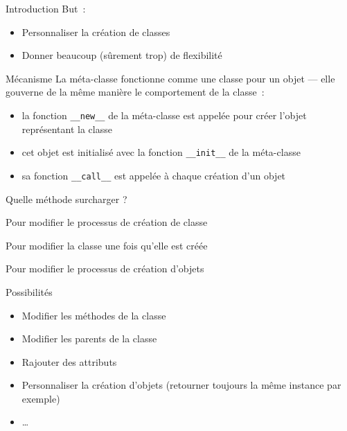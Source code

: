 \begin{frame}{Introduction}
  But~:

  \begin{itemize}[<+->]
    \item Personnaliser la création de classes
    \item Donner beaucoup (sûrement trop) de flexibilité
  \end{itemize}
\end{frame}

\begin{frame}{Mécanisme}
  La méta-classe fonctionne comme une classe pour un objet --- elle gouverne de la même manière le comportement de la classe~:
  \begin{itemize}[<+->]
    \item la fonction \texttt{\_\_new\_\_} de la méta-classe est appelée pour créer l'objet représentant la classe
    \item cet objet est initialisé avec la fonction \texttt{\_\_init\_\_} de la méta-classe
    \item sa fonction \texttt{\_\_call\_\_} est appelée à chaque création d'un objet
  \end{itemize}

\end{frame}

\begin{frame}{Quelle méthode surcharger ?}
  \begin{description}[<+->]
    \item[\texttt{\_\_new\_\_}] Pour modifier le processus de création de classe
    \item[\texttt{\_\_init\_\_}] Pour modifier la classe une fois qu'elle est créée
    \item[\texttt{\_\_call\_\_}] Pour modifier le processus de création d'objets
  \end{description}
\end{frame}

\begin{frame}{Possibilités}
  \begin{itemize}[<+->]
    \item Modifier les méthodes de la classe
    \item Modifier les parents de la classe
    \item Rajouter des attributs
    \item Personnaliser la création d'objets (retourner toujours la même instance par exemple)
    \item …
  \end{itemize}
\end{frame}

